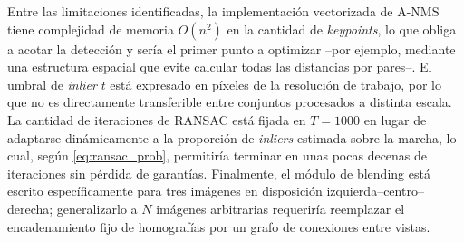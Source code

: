\documentclass[conference]{IEEEtran}
\begin{document}
Entre las limitaciones identificadas, la implementación vectorizada de A-NMS tiene complejidad de memoria $O(n^2)$ en la cantidad de \textit{keypoints}, lo que obliga a acotar la detección y sería el primer punto a optimizar --por ejemplo, mediante una estructura espacial que evite calcular todas las distancias por pares--. El umbral de \textit{inlier} $t$ está expresado en píxeles de la resolución de trabajo, por lo que no es directamente transferible entre conjuntos procesados a distinta escala. La cantidad de iteraciones de RANSAC está fijada en $T=1000$ en lugar de adaptarse dinámicamente a la proporción de \textit{inliers} estimada sobre la marcha, lo cual, según \eqref{eq:ransac_prob}, permitiría terminar en unas pocas decenas de iteraciones sin pérdida de garantías. Finalmente, el módulo de blending está escrito específicamente para tres imágenes en disposición izquierda--centro--derecha; generalizarlo a $N$ imágenes arbitrarias requeriría reemplazar el encadenamiento fijo de homografías por un grafo de conexiones entre vistas.

\renewcommand{\refname}{Referencias}
\nocite{*}


\end{document}

